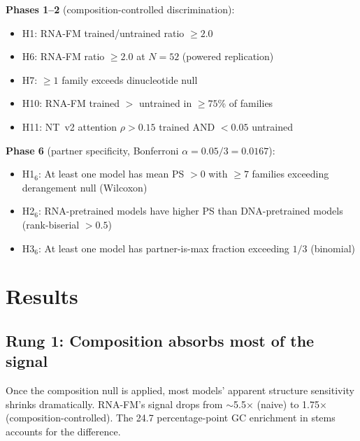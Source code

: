 \documentclass[11pt]{article}
\begin{document}
\textbf{Phases 1--2} (composition-controlled discrimination):
\begin{itemize}[nosep]
\item H1: RNA-FM trained/untrained ratio $\geq 2.0$
\item H6: RNA-FM ratio $\geq 2.0$ at $N = 52$ (powered replication)
\item H7: $\geq 1$ family exceeds dinucleotide null
\item H10: RNA-FM trained $>$ untrained in $\geq 75$\% of families
\item H11: NT~v2 attention $\rho > 0.15$ trained AND $< 0.05$ untrained
\end{itemize}

\textbf{Phase 6} (partner specificity, Bonferroni $\alpha = 0.05/3 = 0.0167$):
\begin{itemize}[nosep]
\item H1$_6$: At least one model has mean PS $> 0$ with $\geq 7$
  families exceeding derangement null (Wilcoxon)
\item H2$_6$: RNA-pretrained models have higher PS than DNA-pretrained
  models (rank-biserial $> 0.5$)
\item H3$_6$: At least one model has partner-is-max fraction exceeding
  $1/3$ (binomial)
\end{itemize}


\section{Results}

\subsection{Rung 1: Composition absorbs most of the signal}

Once the composition null is applied, most models' apparent structure
sensitivity shrinks dramatically. RNA-FM's signal drops from
$\sim$5.5$\times$ (naive) to 1.75$\times$ (composition-controlled).
The 24.7 percentage-point GC enrichment in stems accounts for the
difference.
\end{document}
